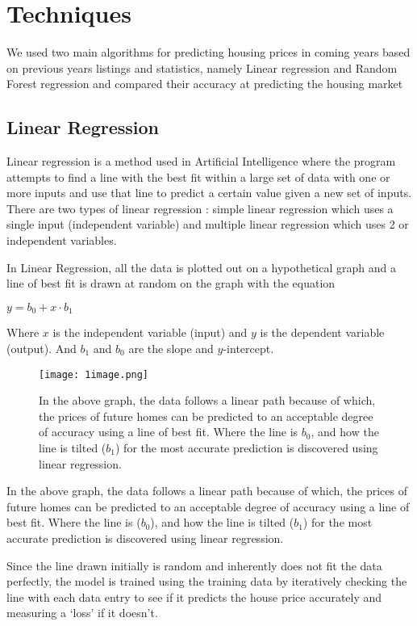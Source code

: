 \documentclass{article}
\begin{document}
\section{Techniques}
We used two main algorithms for predicting housing prices in coming years based on previous years listings and statistics, namely Linear regression and Random Forest regression and compared their accuracy at predicting the housing market

\subsection{Linear Regression}
Linear regression is a method used in Artificial Intelligence where the program attempts to find a line with the best fit within a large set of data with one or more inputs and use that line to predict a certain value given a new set of inputs.
There are two types of linear regression : simple linear regression which uses a single input (independent variable) and multiple linear regression which uses 2 or independent variables.

In Linear Regression, all the data is plotted out on a hypothetical graph and a line of best fit is drawn at random on the graph with the equation 
\begin{center} 
\( y = b_0 + x \cdot b_1 \) 
\end{center}
Where \(x\) is the independent variable (input) and \(y\) is the dependent variable (output). And \(b_1\) and \(b_0\) are the slope and \(y\)-intercept.

\begin{figure}
    \centering
    \texttt{[image: 1image.png]}
    \caption{In the above graph, the data follows a linear path because of which, the prices of future homes can be predicted to an acceptable degree of accuracy using a line of best fit. Where the line is \(b_0\), and how the line is tilted (\(b_1\)) for the most accurate prediction is discovered using linear regression.}
    \label{fig:enter-label}
\end{figure}
 
In the above graph, the data follows a linear path because of which, the prices of future homes can be predicted to an acceptable degree of accuracy using a line of best fit. Where the line is ($b_0$), and how the line is tilted ($b_1$) for the most accurate prediction is discovered using linear regression. 

Since the line drawn initially is random and inherently does not fit the data perfectly, the model is trained using the training data by iteratively checking the line with each data entry to see if it predicts the house price accurately and measuring a ‘loss’ if it doesn’t.
\end{document}
